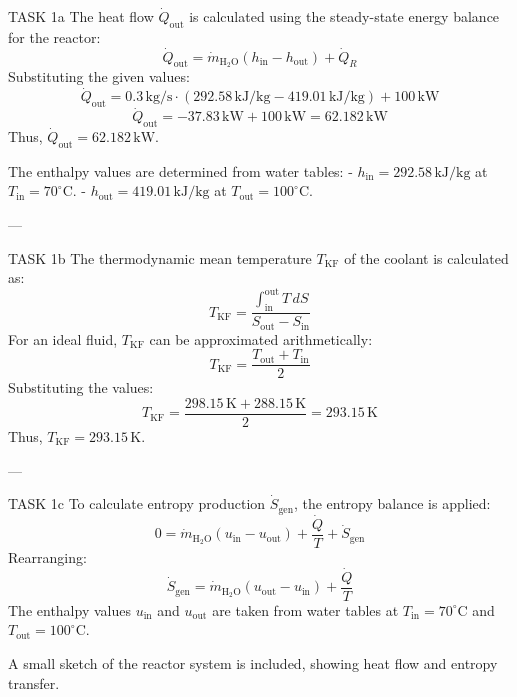 TASK 1a  
The heat flow \( \dot{Q}_{\text{out}} \) is calculated using the steady-state energy balance for the reactor:  
\[
\dot{Q}_{\text{out}} = \dot{m}_{\text{H}_2\text{O}} (h_{\text{in}} - h_{\text{out}}) + \dot{Q}_R
\]  
Substituting the given values:  
\[
\dot{Q}_{\text{out}} = 0.3 \, \text{kg/s} \cdot (292.58 \, \text{kJ/kg} - 419.01 \, \text{kJ/kg}) + 100 \, \text{kW}
\]  
\[
\dot{Q}_{\text{out}} = -37.83 \, \text{kW} + 100 \, \text{kW} = 62.182 \, \text{kW}
\]  
Thus, \( \dot{Q}_{\text{out}} = 62.182 \, \text{kW} \).  

The enthalpy values are determined from water tables:  
- \( h_{\text{in}} = 292.58 \, \text{kJ/kg} \) at \( T_{\text{in}} = 70^\circ\text{C} \).  
- \( h_{\text{out}} = 419.01 \, \text{kJ/kg} \) at \( T_{\text{out}} = 100^\circ\text{C} \).  

---

TASK 1b  
The thermodynamic mean temperature \( T_{\text{KF}} \) of the coolant is calculated as:  
\[
T_{\text{KF}} = \frac{\int_{\text{in}}^{\text{out}} T \, dS}{S_{\text{out}} - S_{\text{in}}}
\]  
For an ideal fluid, \( T_{\text{KF}} \) can be approximated arithmetically:  
\[
T_{\text{KF}} = \frac{T_{\text{out}} + T_{\text{in}}}{2}
\]  
Substituting the values:  
\[
T_{\text{KF}} = \frac{298.15 \, \text{K} + 288.15 \, \text{K}}{2} = 293.15 \, \text{K}
\]  
Thus, \( T_{\text{KF}} = 293.15 \, \text{K} \).  

---

TASK 1c  
To calculate entropy production \( \dot{S}_{\text{gen}} \), the entropy balance is applied:  
\[
0 = \dot{m}_{\text{H}_2\text{O}} (u_{\text{in}} - u_{\text{out}}) + \frac{\dot{Q}}{T} + \dot{S}_{\text{gen}}
\]  
Rearranging:  
\[
\dot{S}_{\text{gen}} = \dot{m}_{\text{H}_2\text{O}} (u_{\text{out}} - u_{\text{in}}) + \frac{\dot{Q}}{T}
\]  
The enthalpy values \( u_{\text{in}} \) and \( u_{\text{out}} \) are taken from water tables at \( T_{\text{in}} = 70^\circ\text{C} \) and \( T_{\text{out}} = 100^\circ\text{C} \).  

A small sketch of the reactor system is included, showing heat flow and entropy transfer.